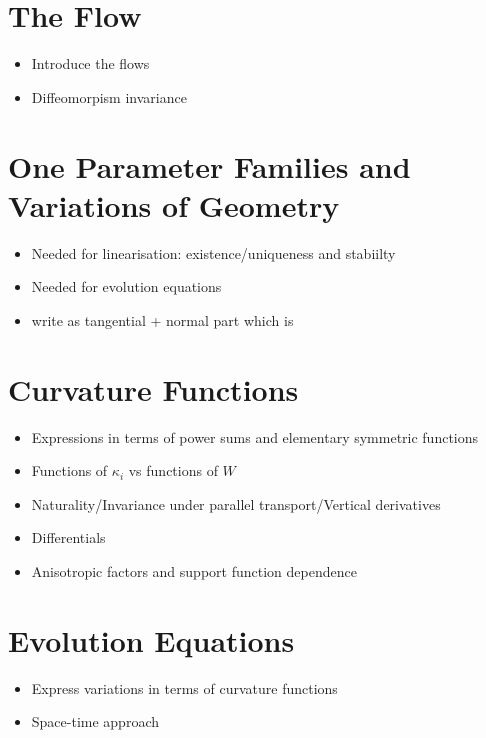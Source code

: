 \section{The Flow}

\begin{itemize}
\item Introduce the flows
\item Diffeomorpism invariance
\end{itemize}

\section{One Parameter Families and Variations of Geometry}

\begin{itemize}
\item Needed for linearisation: existence/uniqueness and stabiilty
\item Needed for evolution equations
\item write as tangential + normal part which is
\end{itemize}

\section{Curvature Functions}

\begin{itemize}
\item Expressions in terms of power sums and elementary symmetric functions
\item Functions of \(\kappa_i\) vs functions of \(W\)
\item Naturality/Invariance under parallel transport/Vertical derivatives
\item Differentials
\item Anisotropic factors and support function dependence
\end{itemize}

\section{Evolution Equations}

\begin{itemize}
\item Express variations in terms of curvature functions
\item Space-time approach
\end{itemize}


